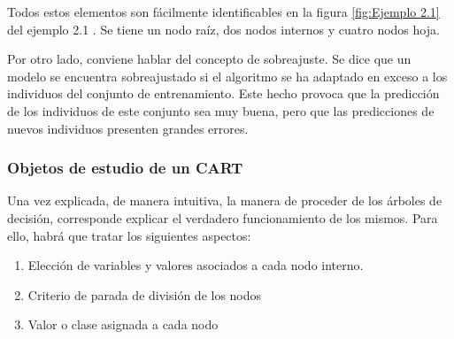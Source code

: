 \documentclass[12pt,twoside]{article}
\begin{document}
Todos estos elementos son fácilmente identificables en la figura \ref{fig:Ejemplo 2.1} del ejemplo 2.1 . Se tiene un nodo raíz, dos nodos internos y cuatro nodos hoja.

Por otro lado, conviene hablar del concepto de sobreajuste. Se dice que un modelo se encuentra sobreajustado si el algoritmo se ha adaptado en exceso a los individuos del conjunto de entrenamiento. Este hecho provoca que la predicción de los individuos de este conjunto sea muy buena, pero que las predicciones de nuevos individuos presenten grandes errores.



\subsubsection{Objetos de estudio de un CART}

Una vez explicada, de manera intuitiva, la manera de proceder de los árboles de decisión, corresponde explicar el verdadero funcionamiento de los mismos. Para ello, habrá que tratar los siguientes aspectos:
\begin{enumerate}
\item Elección de variables y valores asociados a cada nodo interno.
\item Criterio de parada de división de los nodos
\item Valor o clase asignada a cada nodo
\end{enumerate}
\end{document}
